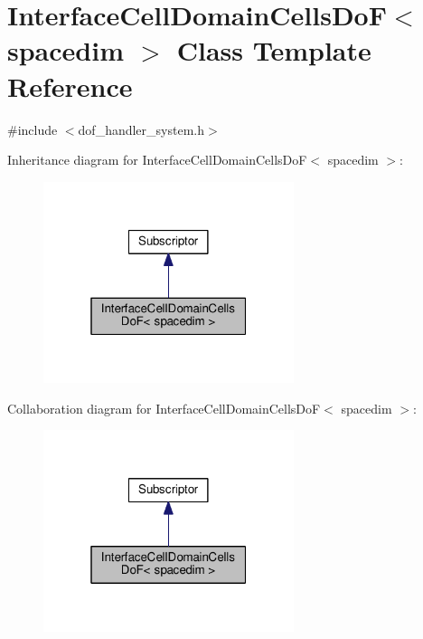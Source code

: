 \hypertarget{class_interface_cell_domain_cells_do_f}{}\section{Interface\+Cell\+Domain\+Cells\+DoF$<$ spacedim $>$ Class Template Reference}
\label{class_interface_cell_domain_cells_do_f}


{\ttfamily \#include $<$dof\+\_\+handler\+\_\+system.\+h$>$}



Inheritance diagram for Interface\+Cell\+Domain\+Cells\+DoF$<$ spacedim $>$\+:
\nopagebreak
\begin{figure}[H]
\begin{center}
\leavevmode
\includegraphics[width=208pt]{class_interface_cell_domain_cells_do_f__inherit__graph}
\end{center}
\end{figure}


Collaboration diagram for Interface\+Cell\+Domain\+Cells\+DoF$<$ spacedim $>$\+:
\nopagebreak
\begin{figure}[H]
\begin{center}
\leavevmode
\includegraphics[width=208pt]{class_interface_cell_domain_cells_do_f__coll__graph}
\end{center}
\end{figure}
